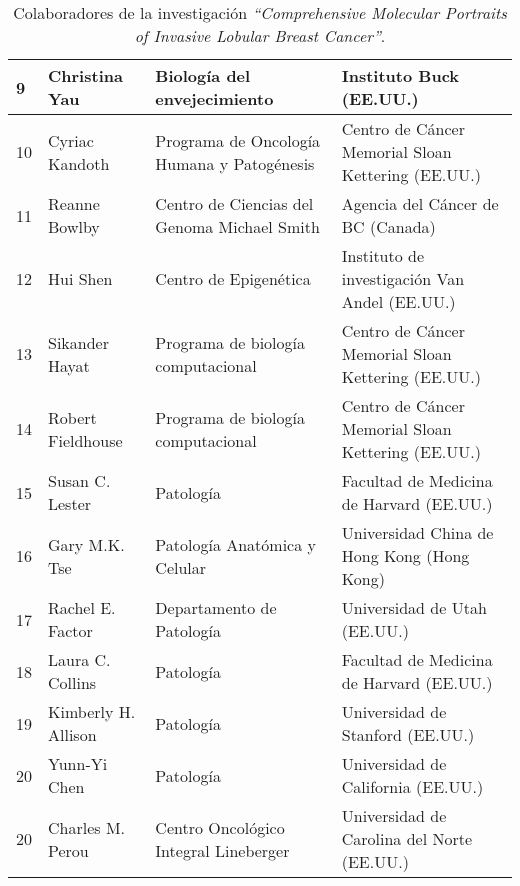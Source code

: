 \begin{table*}[!htb]
\begin{threeparttable}
\begin{tabular}{p{0.5cm} p{3.5cm} p{4cm} p{5.5cm}}
				\\ \hline
				9
				& Christina Yau
				& Biología del envejecimiento
				& Instituto Buck (EE.UU.)
				\\ \hline
				10
				& Cyriac Kandoth
				& Programa de Oncología Humana y Patogénesis
				& Centro de Cáncer Memorial Sloan Kettering (EE.UU.)
				\\ \hline
				11
				& Reanne Bowlby
				& Centro de Ciencias del Genoma Michael Smith
				& Agencia del Cáncer de BC (Canada)
				\\ \hline
				12
				& Hui Shen
				& Centro de Epigenética
				& Instituto de investigación Van Andel (EE.UU.)
				\\ \hline
				13
				& Sikander Hayat
				& Programa de biología computacional
				& Centro de Cáncer Memorial Sloan Kettering (EE.UU.)
				\\ \hline
				14
				& Robert Fieldhouse
				& Programa de biología computacional
				& Centro de Cáncer Memorial Sloan Kettering (EE.UU.)
				\\ \hline
				15
				& Susan C. Lester
				& Patología
				& Facultad de Medicina de Harvard (EE.UU.)
				\\ \hline
				16
				& Gary M.K. Tse
				& Patología Anatómica y Celular
				& Universidad China de Hong Kong (Hong Kong)
				\\ \hline
				17
				& Rachel E. Factor
				& Departamento de Patología
				& Universidad de Utah (EE.UU.)
				\\ \hline
				18
				& Laura C. Collins
				& Patología
				& Facultad de Medicina de Harvard (EE.UU.)
				\\ \hline
				19
				& Kimberly H. Allison
				& Patología
				& Universidad de Stanford (EE.UU.)
				\\ \hline
				20
				& Yunn-Yi Chen
				& Patología
				& Universidad de California (EE.UU.)
				\\ \hline
				20
				& Charles M. Perou
				& Centro Oncológico Integral Lineberger
				& Universidad de Carolina del Norte (EE.UU.)						
				\\ \hline	
			\end{tabular}
			\caption{Colaboradores de la investigación \textit{“Comprehensive Molecular Portraits of Invasive Lobular Breast Cancer”}.}
			\label{Molecular_Portraits}
		\end{threeparttable}
	\end{table*}

